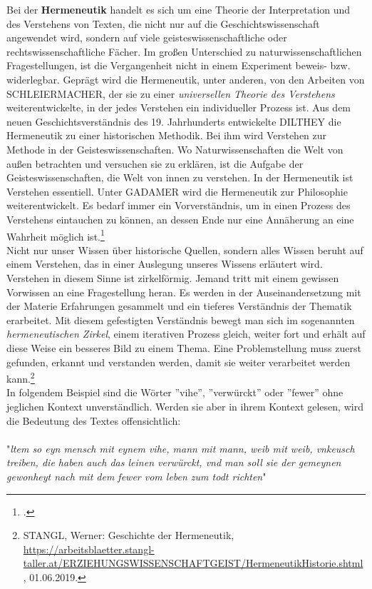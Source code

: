\documentclass[12pt,a4paper]{article}
\begin{document}
Bei der \textbf{Hermeneutik} handelt es sich um eine Theorie der Interpretation und des Verstehens von Texten, die nicht nur auf die Geschichtswissenschaft angewendet wird, sondern auf viele geisteswissenschaftliche oder rechtswissenschaftliche Fächer. Im großen Unterschied zu naturwissenschaftlichen Fragestellungen, ist die Vergangenheit nicht in einem Experiment beweis- bzw. widerlegbar. Geprägt wird die Hermeneutik, unter anderen, von den Arbeiten von SCHLEIERMACHER, der sie zu einer \textit{universellen Theorie des Verstehens} weiterentwickelte, in der jedes Verstehen ein individueller Prozess ist. Aus dem neuen Geschichtsverständnis des 19. Jahrhunderts entwickelte DILTHEY die Hermeneutik zu einer historischen Methodik. Bei ihm wird Verstehen zur Methode in der Geisteswissenschaften. Wo Naturwissenschaften die Welt von außen betrachten und versuchen sie zu erklären, ist die Aufgabe der Geisteswissenschaften, die Welt von innen zu verstehen. In der Hermeneutik ist Verstehen essentiell. Unter GADAMER wird die Hermeneutik zur Philosophie weiterentwickelt. Es bedarf immer ein Vorverständnis, um in einen Prozess des Verstehens eintauchen zu können, an dessen Ende nur eine Annäherung an eine Wahrheit möglich ist.\footcite[][S.19-30]{schulz2010neuere}
\\
Nicht nur unser Wissen über historische Quellen, sondern alles Wissen beruht auf einem Verstehen, das in einer Auslegung unseres Wissens erläutert wird. Verstehen in diesem Sinne ist zirkelförmig. Jemand tritt mit einem gewissen Vorwissen an eine Fragestellung heran. Es werden in der Auseinandersetzung mit der Materie Erfahrungen gesammelt und ein tieferes Verständnis der Thematik erarbeitet. Mit diesem gefestigten Verständnis bewegt man sich im sogenannten  \textit{hermeneutischen Zirkel}, einem iterativen Prozess gleich, weiter fort und erhält auf diese Weise ein besseres Bild zu einem Thema. Eine Problemstellung muss zuerst gefunden, erkannt und verstanden werden, damit sie weiter verarbeitet werden kann.\footnote{STANGL, Werner: Geschichte der Hermeneutik, \protect\url{https://arbeitsblaetter.stangl-taller.at/ERZIEHUNGSWISSENSCHAFTGEIST/HermeneutikHistorie.shtml}, 01.06.2019.}
\\
In folgendem Beispiel sind die Wörter ''vihe'', ''verwürckt'' oder ''fewer'' ohne jeglichen Kontext unverständlich. Werden sie aber in ihrem Kontext gelesen, wird die Bedeutung des Textes offensichtlich:
\\
\\
"\textit{ltem so eyn mensch mit eynem vihe, mann mit mann, weib mit weib, vnkeusch treiben, die haben auch das leinen verwürckt, vnd man soll sie der gemeynen gewonheyt nach mit dem fewer vom leben zum todt richten}" 
\end{document}
